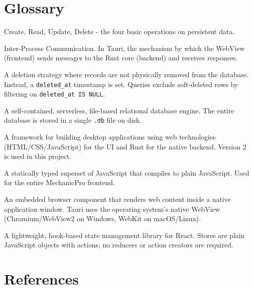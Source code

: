 \documentclass[12pt, a4paper]{report}
\newcommand{\term}[1]{\textbf{\color{Blue}#1}}
\begin{document}
	\appendix

	\chapter{Glossary}

	\begin{description}[leftmargin=3cm, style=nextline]
		\item[\term{CRUD}]
		      Create, Read, Update, Delete - the four basic operations on
		      persistent data.
		\item[\term{IPC}]
		      Inter-Process Communication. In Tauri, the mechanism by which the
		      WebView (frontend) sends messages to the Rust core (backend) and
		      receives responses.
		\item[\term{Soft Delete}]
		      A deletion strategy where records are not physically removed from
		      the database. Instead, a \texttt{deleted\_at} timestamp is set.
		      Queries exclude soft-deleted rows by filtering on
		      \texttt{deleted\_at IS NULL}.
		\item[\term{SQLite}]
		      A self-contained, serverless, file-based relational database engine.
		      The entire database is stored in a single \texttt{.db} file on disk.
		\item[\term{Tauri}]
		      A framework for building desktop applications using web technologies
		      (HTML/CSS/JavaScript) for the UI and Rust for the native backend.
		      Version 2 is used in this project.
		\item[\term{TypeScript}]
		      A statically typed superset of JavaScript that compiles to plain
		      JavaScript. Used for the entire MechanicPro frontend.
		\item[\term{WebView}]
		      An embedded browser component that renders web content inside a
		      native application window. Tauri uses the operating system's native
		      WebView (Chromium/WebView2 on Windows, WebKit on macOS/Linux).
		\item[\term{Zustand}]
		      A lightweight, hook-based state management library for React.
		      Stores are plain JavaScript objects with actions; no reducers or
		      action creators are required.
	\end{description}

	\chapter{References}
\end{document}
